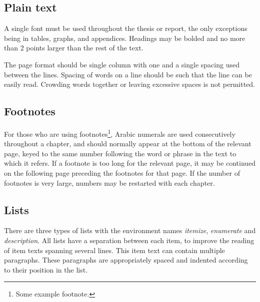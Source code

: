 \subsection*{Plain text}
\label{sec:plaintext}

A single font must be used throughout the thesis or report, the only exceptions being in tables, graphs, and appendices. Headings may be bolded and no more than 2 points larger than the rest of the text.

The page format should be single column with one and a single spacing used
between the lines. Spacing of words on a line should be such that the line can be easily read. Crowding words together or leaving excessive spaces is not permitted.

\subsection*{Footnotes}
\label{sec:footnotes}


For those who are using footnotes\footnote{Some example footnote.}, Arabic numerals are used consecutively throughout a chapter, and should normally appear at the bottom of the relevant page, keyed to the same number following the word or phrase in the text to which it refers. If a footnote is too long for the relevant page, it may be continued on the following page preceding the footnotes for that page. If the number of footnotes is very large, numbers may be restarted with each chapter.


\subsection*{Lists}
\label{sec:lists}

There are three types of lists with the environment names \emph{itemize}, \emph{enumerate} and \emph{description}. All lists have a separation between each item, to improve the reading of item texts spanning several lines. This item text can contain multiple paragraphs. These paragraphs are appropriately spaced and indented according to their position in the list. 

